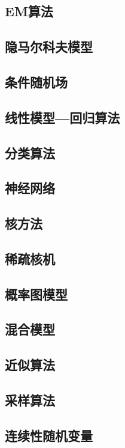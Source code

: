 \documentclass[11pt]{article}
\begin{document}
\subsection{EM算法}
\label{sec:orgdf49d52}
\subsection{隐马尔科夫模型}
\label{sec:org3be65da}
\subsection{条件随机场}
\label{sec:orgae9b8a6}
\subsection{线性模型---回归算法}
\label{sec:org7ea4338}
\subsection{分类算法}
\label{sec:orgf548733}
\subsection{神经网络}
\label{sec:org963cfde}
\subsection{核方法}
\label{sec:orgf097cc7}
\subsection{稀疏核机}
\label{sec:org522c237}
\subsection{概率图模型}
\label{sec:org82a0d7a}
\subsection{混合模型}
\label{sec:orgf23585c}
\subsection{近似算法}
\label{sec:org21f07f2}
\subsection{采样算法}
\label{sec:org0f2a5ae}
\subsection{连续性随机变量}
\label{sec:orge69c7bc}
\end{document}
